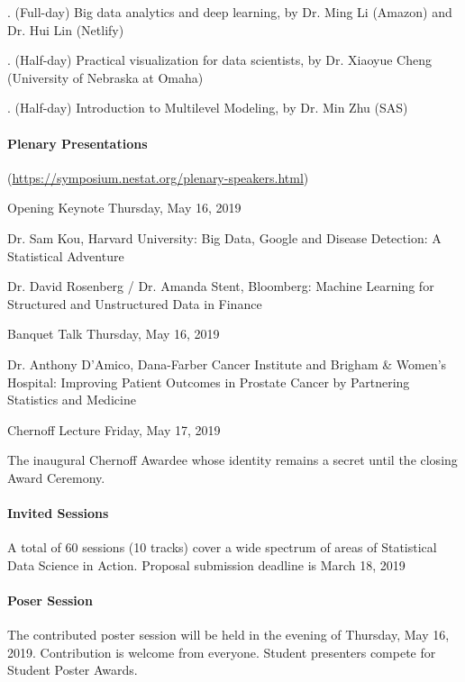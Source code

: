 \documentclass[12pt]{article}
\begin{document}
. (Full-day) Big data analytics and deep learning, by Dr. Ming Li (Amazon) and Dr. Hui Lin (Netlify)

. (Half-day) Practical visualization for data scientists, by Dr. Xiaoyue Cheng (University of Nebraska at Omaha)

. (Half-day) Introduction to Multilevel Modeling, by Dr. Min Zhu (SAS)

\paragraph{Plenary Presentations} (\url{https://symposium.nestat.org/plenary-speakers.html})

\noindent\textsf{Opening Keynote} Thursday, May 16, 2019

Dr. Sam Kou, Harvard University: Big Data, Google and Disease Detection: A Statistical Adventure

Dr. David Rosenberg / Dr. Amanda Stent, Bloomberg: Machine Learning for Structured and Unstructured Data in Finance

\noindent\textsf{Banquet Talk} Thursday, May 16, 2019

Dr. Anthony D'Amico,   Dana-Farber Cancer Institute and Brigham \& Women's Hospital: Improving Patient Outcomes in Prostate Cancer by Partnering Statistics and Medicine

\noindent\textsf{Chernoff Lecture} Friday, May 17, 2019

The inaugural Chernoff Awardee whose identity remains a secret until the closing Award Ceremony.

\paragraph{Invited Sessions}
A total of 60 sessions (10 tracks) cover a wide spectrum of areas of Statistical Data Science in Action. %
Proposal submission deadline is March 18, 2019

\paragraph{Poser Session}
The contributed poster session will be held in the evening of Thursday, May 16, 2019. Contribution is welcome from everyone. Student presenters compete for Student Poster Awards.
\end{document}
